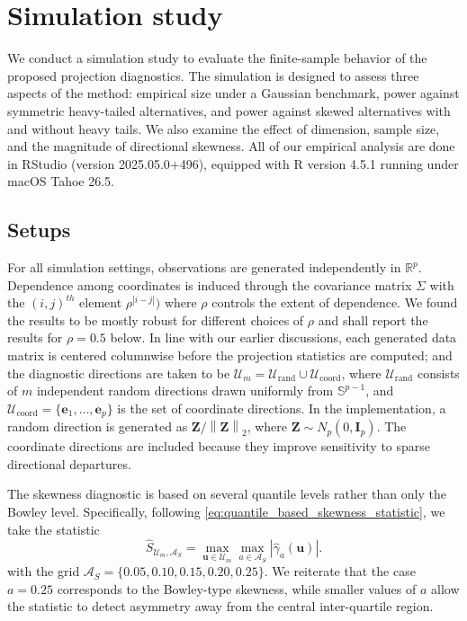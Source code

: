 \documentclass[11pt]{article}
\theoremstyle{plain}
\theoremstyle{definition}
\theoremstyle{remark}
\def\R{\mathbb{R}}
\def\u{\bm{u}}
\newcommand{\identity}{\mathbf{I}}
\newcommand{\abs}[1]{\left\lvert #1 \right\rvert}
\newcommand{\norm}[1]{\left\| #1 \right\|}
\begin{document}
\section{Simulation study}\label{sec:simulation}

We conduct a simulation study to evaluate the finite-sample behavior of the proposed projection diagnostics.  The simulation is designed to assess three aspects of the method: empirical size under a Gaussian benchmark, power against symmetric heavy-tailed alternatives, and power against skewed alternatives with and without heavy tails.  We also examine the effect of dimension, sample size, and the magnitude of directional skewness. All of our empirical analysis are done in RStudio (version 2025.05.0+496), equipped with R version 4.5.1 running under macOS Tahoe 26.5.

\subsection{Setups}

For all simulation settings, observations are generated independently in $\R^p$.  Dependence among coordinates is induced through the covariance matrix $\Sigma$ with the $(i,j)^{th}$ element $\rho^{|i-j|})$ where $\rho$ controls the extent of dependence. We found the results to be mostly robust for different choices of $\rho$ and shall report the results for $\rho=0.5$ below. In line with our earlier discussions, each generated data matrix is centered columnwise before the projection statistics are computed; and the diagnostic directions are taken to be $\mathcal U_m = \mathcal U_{\mathrm{rand}} \cup \mathcal U_{\mathrm{coord}}$, where $\mathcal U_{\mathrm{rand}}$ consists of $m$ independent random directions drawn uniformly from $\mathbb S^{p-1}$, and $\mathcal U_{\mathrm{coord}}=\{\bm{e}_1,\ldots,\bm{e}_p\}$ is the set of coordinate directions.  In the implementation, a random direction is generated as $\bm{Z}/\norm{\bm Z}_2$, where $\bm Z \sim N_p(0,\identity_p)$.  The coordinate directions are included because they improve sensitivity to sparse directional departures.

The skewness diagnostic is based on several quantile levels rather than only the Bowley level. Specifically, following \eqref{eq:quantile_based_skewness_statistic}, we take the statistic
\begin{equation*}
        \widehat S_{\mathcal U_m,\mathcal A_S} = \max_{\u\in\mathcal U_m} \max_{a \in\mathcal A_S}
        \abs{\widehat\gamma_{a}(\u)}.
\end{equation*}
with the grid $\mathcal A_S = \{0.05,0.10,0.15,0.20,0.25\}$. We reiterate that the case $a=0.25$ corresponds to the Bowley-type skewness, while smaller values of $a$ allow the statistic to detect asymmetry away from the central inter-quartile region.
\end{document}
